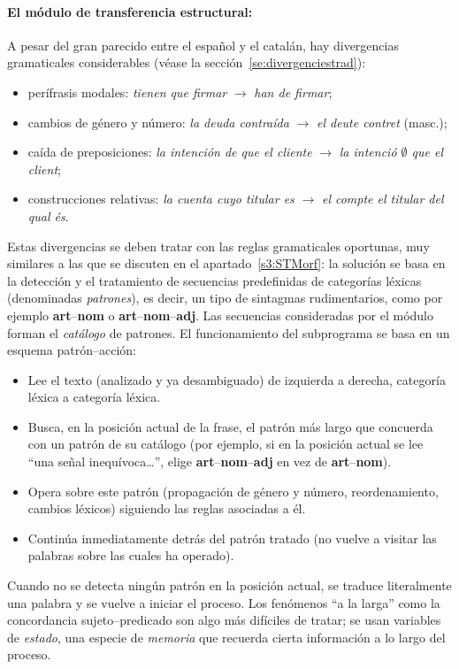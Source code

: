 \paragraph{El módulo de transferencia estructural:} A pesar del gran parecido entre el español y el catalán, hay divergencias gramaticales considerables (véase la sección~\ref{se:divergenciestrad}): \begin{itemize} \item perífrasis modales: \emph{tienen que firmar} $\rightarrow$ \emph{han de firmar}; \item cambios de género y número: \emph{la deuda contraída} $\rightarrow$ \emph{el deute contret} (masc.); \item caída de preposiciones: \emph{la intención de que el cliente} $\rightarrow$ \emph{la intenció $\emptyset$ que el client}; \item construcciones relativas: \emph{la cuenta cuyo titular es} $\rightarrow$ \emph{el compte el titular del qual és}. \end{itemize} Estas divergencias se deben tratar con las reglas gramaticales oportunas, muy similares a las que se discuten en el apartado~\ref{s3:STMorf}: la solución se basa en la detección y el tratamiento de secuencias predefinidas de categorías léxicas (denominadas \emph{patrones}), es decir, un tipo de sintagmas rudimentarios, como por ejemplo {\bf art}--{\bf nom} o {\bf art}--{\bf nom}--{\bf adj}. Las secuencias consideradas por el módulo  forman el \emph{catálogo} de patrones. El funcionamiento del subprograma se basa en un esquema patrón--acción: \begin{itemize} \item Lee el texto (analizado y ya desambiguado) de izquierda a derecha, categoría léxica a categoría léxica. \item Busca, en la posición actual de la frase, el patrón más largo que concuerda con un patrón de su catálogo (por ejemplo, si en la posición actual se lee ``una señal inequívoca\ldots'', elige {\bf art}--{\bf nom}--{\bf adj} en vez de {\bf art}--{\bf nom}). \item Opera sobre este patrón (propagación de género y número, reordenamiento, cambios léxicos) siguiendo las reglas asociadas a él. \item Continúa inmediatamente detrás del patrón tratado (no vuelve a visitar las palabras sobre las cuales ha operado). \end{itemize} Cuando no se detecta ningún patrón en la posición actual, se traduce literalmente una palabra y se vuelve a iniciar el proceso. Los fenómenos ``a la larga'' como la concordancia sujeto--predicado son algo más difíciles de tratar; se usan variables de \emph{estado}, una especie de \emph{memoria } que recuerda cierta información a lo largo del proceso. 

